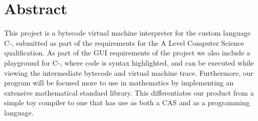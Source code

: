 \begingroup
\let\clearpage\relax
\let\cleardoublepage\relax
\let\cleardoublepage\relax

\chapter*{Abstract}
This project is a bytecode virtual machine interpreter for the custom language C-, submitted as part of the requirements for the A Level Computer Science qualification. As part of the GUI requirements of the project we also include a playground for C-, where code is syntax highlighted, and can be executed while viewing the intermediate bytecode and virtual machine trace. Furthermore, our program will be focused more to use in mathematics by implementing an extensive mathematical standard library. This differentiates our product from a simple toy compiler to one that has use as both a \ac{CAS} and as a programming language. 
\endgroup			

\vfill